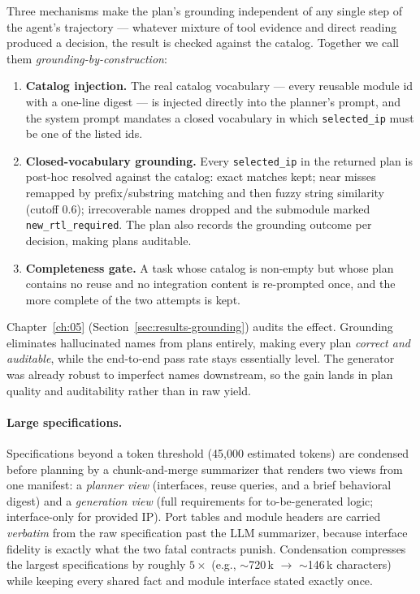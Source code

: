 Three mechanisms make the plan's grounding independent of any single
step of the agent's trajectory --- whatever mixture of tool evidence and
direct reading produced a decision, the result is checked against the
catalog. Together we call them \emph{grounding-by-construction}:

\begin{enumerate}
  \item \textbf{Catalog injection.} The real catalog vocabulary --- every
    reusable module id with a one-line digest --- is injected directly into
    the planner's prompt, and the system prompt mandates a closed
    vocabulary in which \texttt{selected\_ip} must be one of the listed ids.
  \item \textbf{Closed-vocabulary grounding.} Every \texttt{selected\_ip} in
    the returned plan is post-hoc resolved against the catalog: exact
    matches kept; near misses remapped by prefix/substring matching and then
    fuzzy string similarity (cutoff 0.6); irrecoverable names dropped and
    the submodule marked \texttt{new\_rtl\_required}. The plan also
    records the grounding outcome per decision, making plans auditable.
  \item \textbf{Completeness gate.} A task whose catalog is non-empty but
    whose plan contains no reuse and no integration content is re-prompted
    once, and the more complete of the two attempts is kept.
\end{enumerate}

Chapter~\ref{ch:05} (Section~\ref{sec:results-grounding}) audits the effect.
Grounding eliminates hallucinated names from plans entirely, making every
plan \emph{correct and auditable}, while the end-to-end pass rate stays
essentially level. The generator was already robust to imperfect names
downstream, so the gain lands in plan quality and auditability rather
than in raw yield.

\paragraph{Large specifications.}
Specifications beyond a token threshold (45{,}000 estimated tokens) are
condensed before planning by a chunk-and-merge summarizer that renders two
views from one manifest: a \emph{planner view} (interfaces, reuse queries,
and a brief behavioral digest) and a \emph{generation view} (full
requirements for to-be-generated logic; interface-only for provided IP).
Port tables and module headers are carried \emph{verbatim} from the raw
specification past the LLM summarizer, because interface fidelity is exactly
what the two fatal contracts punish. Condensation compresses the largest
specifications by roughly $5\times$ (e.g., $\sim$720\,k $\to$ $\sim$146\,k
characters) while keeping every shared fact and module interface stated
exactly once.

